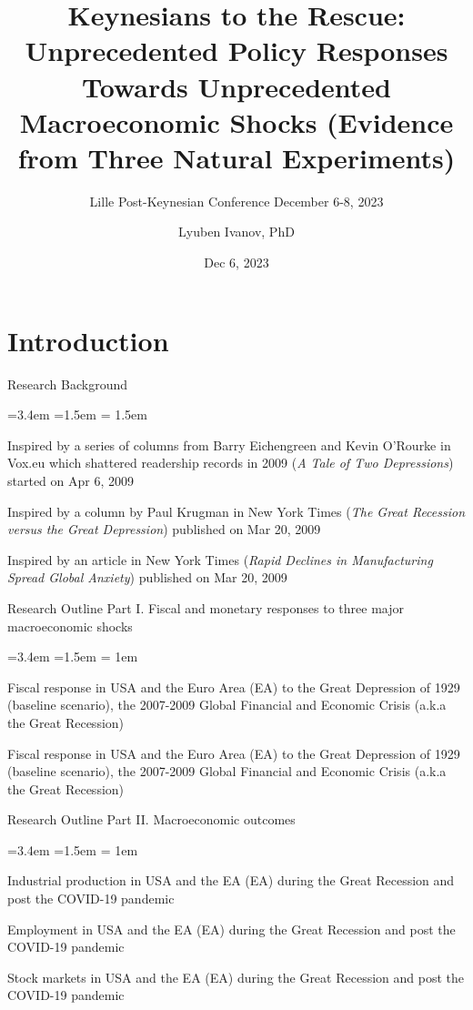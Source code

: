\documentclass{beamer}
\title{Keynesians to the Rescue: Unprecedented Policy Responses Towards Unprecedented Macroeconomic Shocks (Evidence from Three Natural Experiments)}
\subtitle{Lille Post-Keynesian Conference 
\newline December 6-8, 2023 }
\date{Dec 6, 2023}
\author{Lyuben Ivanov, PhD}
\institute{Faculty of Economics and Business, Sofia University St. Kliment Ohridski}
\begin{document}
\maketitle

\section{Introduction}

\begin{frame}{Research Background}
\vfill
\begin{list}{\faChevronCircleRight}{\leftmargin=3.4em =1.5em 
\itemsep = 1.5em}
\item Inspired by a series of columns from Barry Eichengreen and Kevin O'Rourke in Vox.eu which shattered readership records in 2009 (\textit{A Tale of Two Depressions}) started on Apr 6, 2009
\item Inspired by a column by Paul Krugman in New York Times (\textit{The Great Recession versus the Great Depression}) published on Mar 20, 2009
\item Inspired by an article in New York Times (\textit{Rapid Declines in Manufacturing Spread Global Anxiety}) published on Mar 20, 2009
\end{list}
	
\end{frame}

\begin{frame}{Research Outline}
Part I. Fiscal and monetary responses to three major macroeconomic shocks
\begin{list}{\faChevronCircleRight}{\leftmargin=3.4em =1.5em 
\itemsep = 1em}
\item [\ding{202}] Fiscal response in USA and the Euro Area (EA) to the Great Depression of 1929 (baseline scenario), the 2007-2009 Global Financial and Economic Crisis (a.k.a the Great Recession)
\item [\ding{203}] Fiscal response in USA and the Euro Area (EA) to the Great Depression of 1929 (baseline scenario), the 2007-2009 Global Financial and Economic Crisis (a.k.a the Great Recession)
\end{list}
\end{frame}

\begin{frame}{Research Outline}
Part II. Macroeconomic outcomes
\begin{list}{\faChevronCircleRight}{\leftmargin=3.4em =1.5em 
\itemsep = 1em}
\item [\ding{202}] Industrial production in USA and the EA (EA) during the Great Recession and post the COVID-19 pandemic
\item [\ding{203}] Employment in USA and the EA (EA) during the Great Recession and post the COVID-19 pandemic
\item [\ding{204}] Stock markets in USA and the EA (EA) during the Great Recession and post the COVID-19 pandemic

\end{list}	
\end{frame}
\end{document}
